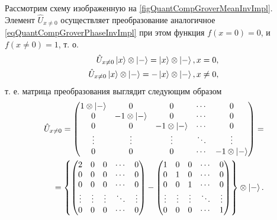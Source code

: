 

Рассмотрим схему изображенную на
\autoref{figQuantCompGroverMeanInvImpl}. Элемент $\hat{U}_{x \ne 0}$
осуществляет преобразование аналогичное
\eqref{eqQuantCompGroverPhaseInvImpl} при этом функция
$f\left(x = 0\right) = 0$, и $f\left(x \ne 0\right) = 1$, т. о.
\begin{eqnarray}
\hat{U}_{x \ne 0} \ket{x}\otimes\ket{-} 
= \ket{x}\otimes\ket{-}, x = 0,
\nonumber \\
\hat{U}_{x \ne 0} \ket{x}\otimes\ket{-} 
= - \ket{x}\otimes\ket{-}, x \ne 0,
\nonumber
\end{eqnarray}
т. е. матрица преобразования выглядит следующим образом
\begin{eqnarray}
\hat{U}_{x \ne 0} = 
\begin{pmatrix}
1 \otimes \ket{-} & 0 & 0 & \cdots & 0 \\
0 & -1 \otimes \ket{-}  & 0 & \cdots & 0 \\
0 & 0 & -1 \otimes \ket{-}   & \cdots & 0 \\
\vdots & \vdots & \vdots & \ddots & \vdots \\
0 & 0 & 0  & \cdots & -1 \otimes \ket{-}  \\
\end{pmatrix}
=
\nonumber \\
=
\left\{
\begin{pmatrix}
2  & 0 & 0 & \cdots & 0 \\
0 & 0 & 0 & \cdots & 0 \\
0 & 0 & 0 & \cdots & 0 \\
\vdots & \vdots & \vdots & \ddots & \vdots \\
0 & 0 & 0  & \cdots & 0 \\
\end{pmatrix} - 
\begin{pmatrix}
1 & 0 & 0 & \cdots & 0 \\
0 & 1 & 0 & \cdots & 0 \\
0 & 0 & 1 & \cdots & 0 \\
\vdots & \vdots & \vdots & \ddots & \vdots \\
0 & 0 & 0  & \cdots & 1  \\
\end{pmatrix}
\right\}
\otimes \ket{-} 
. 
\nonumber
\end{eqnarray}

